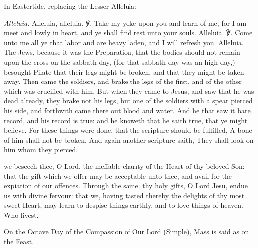 \begin{rubric}
{In Eastertide, replacing the Lesser Alleluia:}
\end{rubric}\par\noindent
\textit{Alleluia.} Alleluia, alleluia. ℣. Take my yoke upon you and learn of me, for I am meet and lowly in heart, and ye shall find rest unto your souls. Alleluia. ℣. Come unto me all ye that labor and are heavy laden, and I will refresh you. Alleluia.
 The Jews, because it was the Preparation, that the bodies should not remain upon the cross on the sabbath day, (for that sabbath day was an high day,) besought Pilate that their legs might be broken, and that they might be taken away. Then came the soldiers, and brake the legs of the first, and of the other which was crucified with him. But when they came to Jesus, and saw that he was dead already, they brake not his legs, but one of the soldiers with a spear pierced his side, and forthwith came there out blood and water. And he that saw it bare record, and his record is true: and he knoweth that he saith true, that ye might believe. For these things were done, that the scripture should be fulfilled, A bone of him shall not be broken. And again another scripture saith, They shall look on him whom they pierced.

\secret
{} we beseech thee, O Lord, the ineffable charity of the Heart of thy beloved Son: that the gift which we offer may be acceptable unto thee, and avail for the expiation of our offences. Through the same.
\postcommunion
{} thy holy gifts, O Lord Jesu, endue us with divine fervour: that we, having tasted thereby the delights of thy most sweet Heart, may learn to despise things earthly, and to love things of heaven. Who livest.

\begin{rubric}
    On the Octave Day of the Compassion of Our Lord (Simple), Mass is said as on the Feast.
\end{rubric}


